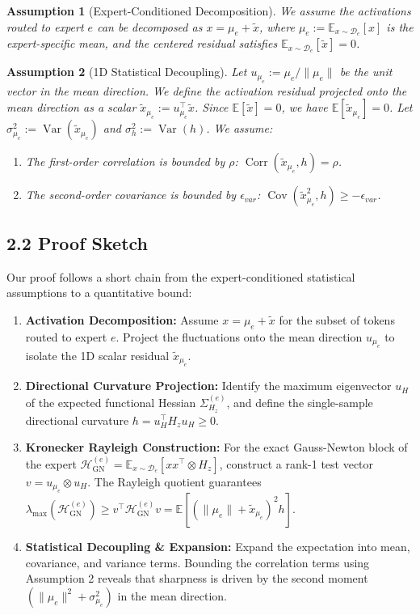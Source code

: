 \documentclass[11pt]{article}
\newtheorem{assumption}{Assumption}
\begin{document}
\begin{assumption}[Expert-Conditioned Decomposition]
We assume the activations routed to expert $e$ can be decomposed as $x = \mu_e + \tilde{x}$, where $\mu_e := \mathbb{E}_{x \sim \mathcal{D}_e}[x]$ is the expert-specific mean, and the centered residual satisfies $\mathbb{E}_{x \sim \mathcal{D}_e}[\tilde{x}] = 0$.
\end{assumption}

\begin{assumption}[1D Statistical Decoupling]
Let $u_{\mu_e} := \mu_e/\|\mu_e\|$ be the unit vector in the mean direction. We define the activation residual projected onto the mean direction as a scalar $\tilde{x}_{\mu_e} := u_{\mu_e}^\top \tilde{x}$. Since $\mathbb{E}[\tilde{x}] = 0$, we have $\mathbb{E}[\tilde{x}_{\mu_e}] = 0$. Let $\sigma_{\mu_e}^2 := \operatorname{Var}(\tilde{x}_{\mu_e})$ and $\sigma_h^2 := \operatorname{Var}(h)$. We assume:
\begin{enumerate}
    \item The first-order correlation is bounded by $\rho$: $\operatorname{Corr}(\tilde{x}_{\mu_e}, h) = \rho$.
    \item The second-order covariance is bounded by $\epsilon_{var}$: $\operatorname{Cov}(\tilde{x}_{\mu_e}^2, h) \ge -\epsilon_{var}$.
\end{enumerate}
\end{assumption}

\subsection*{2.2 Proof Sketch}

Our proof follows a short chain from the expert-conditioned statistical assumptions to a quantitative bound:

\begin{enumerate}
    \item \textbf{Activation Decomposition:} Assume $x = \mu_e + \tilde{x}$ for the subset of tokens routed to expert $e$. Project the fluctuations onto the mean direction $u_{\mu_e}$ to isolate the 1D scalar residual $\tilde{x}_{\mu_e}$.
    \item \textbf{Directional Curvature Projection:} Identify the maximum eigenvector $u_H$ of the expected functional Hessian $\Sigma_{H_z}^{(e)}$, and define the single-sample directional curvature $h = u_H^\top H_z u_H \ge 0$.
    \item \textbf{Kronecker Rayleigh Construction:} For the exact Gauss-Newton block of the expert $\mathcal{H}_{\mathrm{GN}}^{(e)} = \mathbb{E}_{x \sim \mathcal{D}_e}[xx^\top \otimes H_z]$, construct a rank-1 test vector $v = u_{\mu_e} \otimes u_H$. The Rayleigh quotient guarantees $\lambda_{\max}(\mathcal{H}_{\mathrm{GN}}^{(e)}) \ge v^\top \mathcal{H}_{\mathrm{GN}}^{(e)} v = \mathbb{E}[(\|\mu_e\| + \tilde{x}_{\mu_e})^2 h]$.
    \item \textbf{Statistical Decoupling \& Expansion:} Expand the expectation into mean, covariance, and variance terms. Bounding the correlation terms using Assumption 2 reveals that sharpness is driven by the second moment $(\|\mu_e\|^2 + \sigma_{\mu_e}^2)$ in the mean direction.
\end{enumerate}
\end{document}
